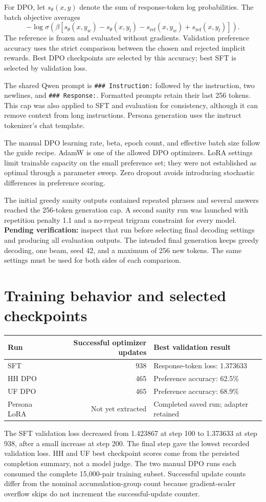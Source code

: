 \documentclass[10pt,a4paper]{article}
\newcommand{\pending}[1]{\textcolor{red!65!black}{\textbf{Pending verification:} #1}}
\begin{document}
For DPO, let $s_\theta(x,y)$ denote the sum of response-token log probabilities. The batch objective averages
\[
 -\log\sigma\left(\beta\left[
 s_\theta(x,y_w)-s_\theta(x,y_l)-s_{\mathrm{ref}}(x,y_w)+s_{\mathrm{ref}}(x,y_l)
 \right]\right).
\]
The reference is frozen and evaluated without gradients. Validation preference accuracy uses the strict comparison between the chosen and rejected implicit rewards. Best DPO checkpoints are selected by this accuracy; best SFT is selected by validation loss.

The shared Qwen prompt is \texttt{\#\#\# Instruction:} followed by the instruction, two newlines, and \texttt{\#\#\# Response:}. Formatted prompts retain their last 256 tokens. This cap was also applied to SFT and evaluation for consistency, although it can remove context from long instructions. Persona generation uses the instruct tokenizer's chat template.

The manual DPO learning rate, beta, epoch count, and effective batch size follow the guide recipe. AdamW is one of the allowed DPO optimizers. LoRA settings limit trainable capacity on the small preference set; they were not established as optimal through a parameter sweep. Zero dropout avoids introducing stochastic differences in preference scoring.

The initial greedy sanity outputs contained repeated phrases and several answers reached the 256-token generation cap. A second sanity run was launched with repetition penalty 1.1 and a no-repeat trigram constraint for every model. \pending{inspect that run before selecting final decoding settings and producing all evaluation outputs.} The intended final generation keeps greedy decoding, one beam, seed 42, and a maximum of 256 new tokens. The same settings must be used for both sides of each comparison.

\section{Training behavior and selected checkpoints}
\begin{center}
\begin{tabular}{lrl}\toprule
Run & Successful optimizer updates & Best validation result\\\midrule
SFT & 938 & Response-token loss: 1.373633\\
HH DPO & 465 & Preference accuracy: 62.5\%\\
UF DPO & 465 & Preference accuracy: 68.9\%\\
Persona LoRA & Not yet extracted & Completed saved run; adapter retained\\\bottomrule
\end{tabular}
\end{center}
The SFT validation loss decreased from 1.423867 at step 100 to 1.373633 at step 938, after a small increase at step 200. The final step gave the lowest recorded validation loss. HH and UF best checkpoint scores come from the persisted completion summary, not a model judge. The two manual DPO runs each consumed the complete 15,000-pair training subset. Successful update counts differ from the nominal accumulation-group count because gradient-scaler overflow skips do not increment the successful-update counter.
\end{document}
